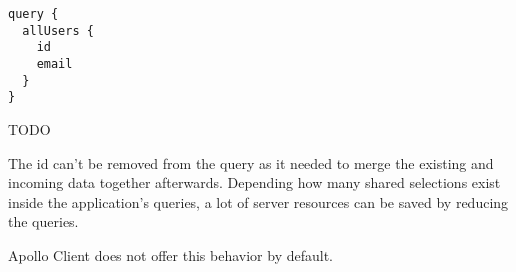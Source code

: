 \ifshowListings
\begin{listing}[H]
\begin{verbatim}
query {
  allUsers {
    id
    email
  }
}
\end{verbatim}
\caption{TODO}\label{code:background:graphql:query-reduction:example-query-reduced}
\end{listing}
\fi

The id can't be removed from the query as it needed to merge the existing and incoming data together afterwards. Depending how many shared selections exist inside the application's queries, a lot of server resources can be saved by reducing the queries. 

Apollo Client does not offer this behavior by default. 